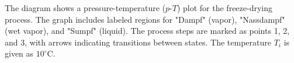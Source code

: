 The diagram shows a pressure-temperature (\( p \)-\( T \)) plot for the freeze-drying process. The graph includes labeled regions for "Dampf" (vapor), "Nassdampf" (wet vapor), and "Sumpf" (liquid). The process steps are marked as points 1, 2, and 3, with arrows indicating transitions between states. The temperature \( T_i \) is given as \( 10^\circ\text{C} \).